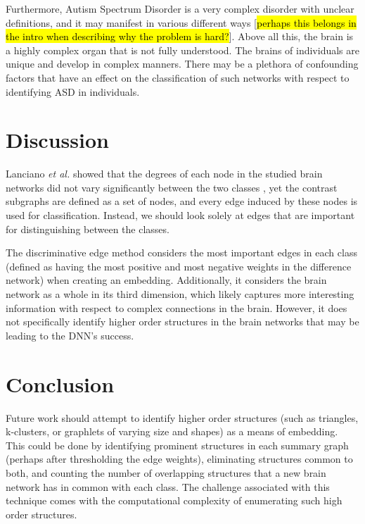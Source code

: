 \documentclass[sigconf]{acmart}
\begin{document}
Furthermore, Autism Spectrum Disorder is a very complex disorder with unclear definitions, and it may manifest in various different ways [\hl{perhaps this belongs in the intro when describing why the problem is hard?}].
Above all this, the brain is a highly complex organ that is not fully understood.
The brains of individuals are unique and develop in complex manners.
There may be a plethora of confounding factors that have an effect on the classification of such networks with respect to identifying ASD in individuals.

\section{Discussion} \label{discussion}

Lanciano \emph{et al.} showed that the degrees of each node in the studied brain networks did not vary significantly between the two classes \cite{lanciano2020},
yet the contrast subgraphs are defined as a set of nodes, and every edge induced by these nodes is used for classification.
Instead, we should look solely at edges that are important for distinguishing between the classes.

The discriminative edge method considers the most important edges in each class (defined as having the most positive and most negative weights in the difference network) when creating an embedding.
Additionally, it considers the brain network as a whole in its third dimension, which likely captures more interesting information with respect to complex connections in the brain.
However, it does not specifically identify higher order structures in the brain networks that may be leading to the DNN's success.

\section{Conclusion} \label{conclusion}

Future work should attempt to identify higher order structures (such as triangles, k-clusters, or graphlets of varying size and shapes) as a means of embedding.
This could be done by identifying prominent structures in each summary graph (perhaps after thresholding the edge weights), eliminating structures common to both, and counting the number of overlapping structures that a new brain network has in common with each class.
The challenge associated with this technique comes with the computational complexity of enumerating such high order structures.
\end{document}
